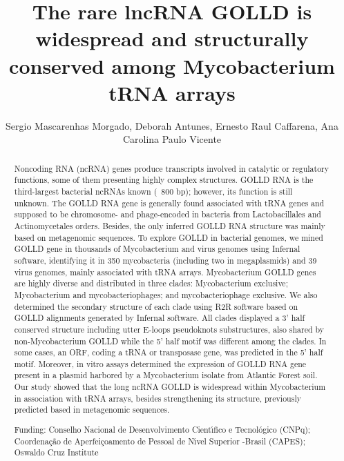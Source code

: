 \documentclass[twoside]{article}
\title{\vspace{-15mm}\fontsize{24pt}{10pt}\selectfont\textbf{ The rare lncRNA GOLLD is widespread and structurally conserved among Mycobacterium tRNA arrays }} %
\author{ Sergio Mascarenhas Morgado, Deborah Antunes, Ernesto Raul Caffarena, Ana Carolina Paulo Vicente }
\affil{ Oswaldo Cruz Institute }
\date{}
\begin{document}
  
  
  \maketitle %
  
  
  \thispagestyle{fancy} %
  
  
  \begin{abstract}
  Noncoding RNA (ncRNA) genes produce transcripts involved in catalytic or regulatory functions,  some of them presenting highly complex structures. GOLLD RNA is the third-largest bacterial ncRNAs known (~800 bp); however,  its function is still unknown. The GOLLD RNA gene is generally found associated with tRNA genes and supposed to be chromosome- and phage-encoded in bacteria from Lactobacillales and Actinomycetales orders. Besides,  the only inferred GOLLD RNA structure was mainly based on metagenomic sequences. To explore GOLLD in bacterial genomes,  we mined GOLLD gene in thousands of Mycobacterium and virus genomes using Infernal software,  identifying it in 350 mycobacteria (including two in megaplasmids) and 39 virus genomes,  mainly associated with tRNA arrays. Mycobacterium GOLLD genes are highly diverse and distributed in three clades: Mycobacterium exclusive; Mycobacterium and mycobacteriophages; and mycobacteriophage exclusive. We also determined the secondary structure of each clade using R2R software based on GOLLD alignments generated by Infernal software. All clades displayed a 3' half conserved structure including utter E-loops pseudoknots substructures,  also shared by non-Mycobacterium GOLLD while the 5' half motif was different among the clades. In some cases,  an ORF,  coding a tRNA or transposase gene,  was predicted in the  5' half motif. Moreover,  in vitro assays determined the expression of GOLLD RNA gene present in a plasmid harbored by a Mycobacterium isolate from Atlantic Forest soil. Our study showed that the long ncRNA GOLLD is widespread within Mycobacterium in association with tRNA arrays,  besides strengthening its structure,  previously predicted based in metagenomic sequences.
  
  Funding: Conselho Nacional de Desenvolvimento Cient\'{\i}fico e Tecnol\'ogico (CNPq); Coordena\c{c}\~ao de Aperfei\c{c}oamento de Pessoal de N\'{\i}vel Superior -Brasil (CAPES); Oswaldo Cruz Institute \\ 
  \end{abstract}
  
\end{document}
